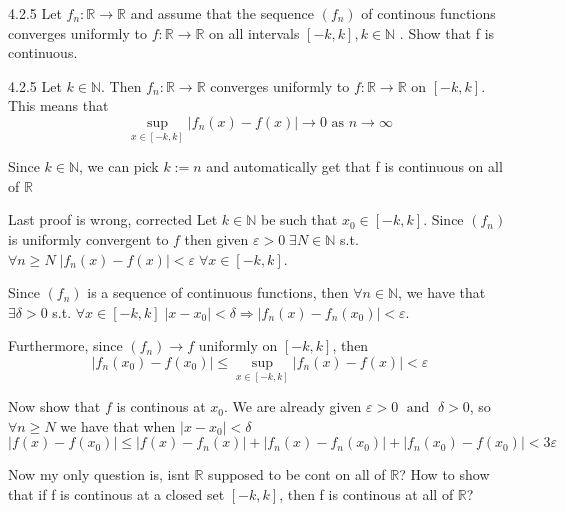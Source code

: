 \documentclass[a4paper,norsk]{article}
\renewcommand{\geq}{\geqslant}
\renewcommand{\leq}{\leqslant}
\renewcommand{\epsilon}{\varepsilon}
\begin{document}
\begin{oppgavebox}{4.2.5}{}
Let $ f_n : \mathbb{R} \to \mathbb{R} $ and assume that the sequence $ \left( f_n \right)  $ of continous functions converges uniformly to $ f : \mathbb{R} \to \mathbb{R} $ on all intervals $ \left[ -k, k \right] , k \in \mathbb{N} $ . Show that f is continuous.

\begin{proofbox}{4.2.5}{}
  Let $ k \in \mathbb{N} $. Then $ f_n : \mathbb{R} \to \mathbb{R} $ converges uniformly to $ f: \mathbb{R} \to \mathbb{R} $ on $ \left[ -k, k \right]  $. This means that
  \[
      \sup_{x \in \left[ -k, k \right] } \left| f_n(x) - f(x) \right| \to 0 \text{ as } n \to \infty
  \]
  
  Since $ k \in \mathbb{N} $, we can pick $ k := n $  and automatically get that f is continuous on all of $ \mathbb{R} $ 
\end{proofbox}

\begin{proofbox}{Last proof is wrong, corrected}{}
  Let $ k \in \mathbb{N} $ be such that $ x_0 \in \left[ -k, k \right]  $. Since $ \left( f_n\right)  $ is uniformly convergent to $ f $ then given $ \epsilon  >0 \; \exists N \in \mathbb{N} $ s.t. $ \forall n \geq N \; \left| f_n(x) - f(x) \right| < \epsilon  \; \forall x \in \left[ -k, k \right]  $. 

  Since $ \left( f_n \right)  $ is a sequence of continuous functions, then $ \forall n \in \mathbb{N} $, we have that $ \exists \delta > 0 $  s.t. $ \forall x \in \left[ -k, k \right] \; \left| x - x_0  \right| < \delta  \Rightarrow \left| f_n(x) - f_n(x_0) \right| < \epsilon  $.

  Furthermore, since $ \left( f_n \right) \to f $ uniformly on $ \left[ -k, k \right]  $, then 
  \[
      \left| f_n(x_0) - f(x_0) \right| \leq \sup_{ x \in \left[ -k, k \right] } \left| f_n(x) - f(x) \right| < \epsilon 
  \]



  Now show that $ f  $ is continous at $ x_0 $. We are already given $ \epsilon > 0 \; \text{ and } \; \delta > 0 $, so $ \forall n \geq N $ we have that when $ \left| x - x_0 \right| < \delta  $ 
  \[
      \left| f(x) - f(x_0) \right| \leq \left| f(x) - f_n(x) \right| + \left| f_n(x) - f_n(x_0) \right| + \left| f_n(x_0) - f(x_0)  \right| < 3 \epsilon 
  \]
  

  Now my only question is, isnt $ \mathbb{R}  $ supposed to be cont on all of $ \mathbb{R} $? How to show that if f is continous at a closed set $ \left[ -k, k \right]  $, then f is continous at all of $ \mathbb{R} $?
  
\end{proofbox}
\end{oppgavebox}
\end{document}

